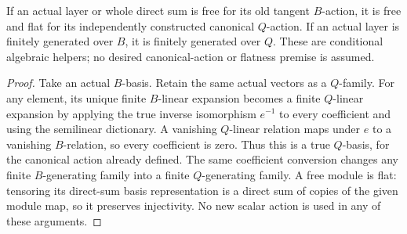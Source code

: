 \begin{lemma}
\label{hir:relative-normal-canonical-centre-free-flat-dictionary}
\leanok
If an actual layer or whole direct sum is free for its old tangent
$B$-action, it is free and flat for its independently constructed
canonical $Q$-action.  If an actual layer is finitely generated over $B$,
it is finitely generated over $Q$.  These are conditional algebraic
helpers; no desired canonical-action or flatness premise is assumed.
\end{lemma}
\begin{proof}
Take an actual $B$-basis.  Retain the same actual vectors as a $Q$-family.
For any element, its unique finite $B$-linear expansion becomes a finite
$Q$-linear expansion by applying the true inverse isomorphism $e^{-1}$
to every coefficient and using the semilinear dictionary.  A vanishing
$Q$-linear relation maps under $e$ to a vanishing $B$-relation, so every
coefficient is zero.  Thus this is a true $Q$-basis, for the canonical
action already defined.  The same coefficient conversion changes any
finite $B$-generating family into a finite $Q$-generating family.  A free
module is flat: tensoring its direct-sum basis representation is a direct
sum of copies of the given module map, so it preserves injectivity.
No new scalar action is used in any of these arguments.
\end{proof}

